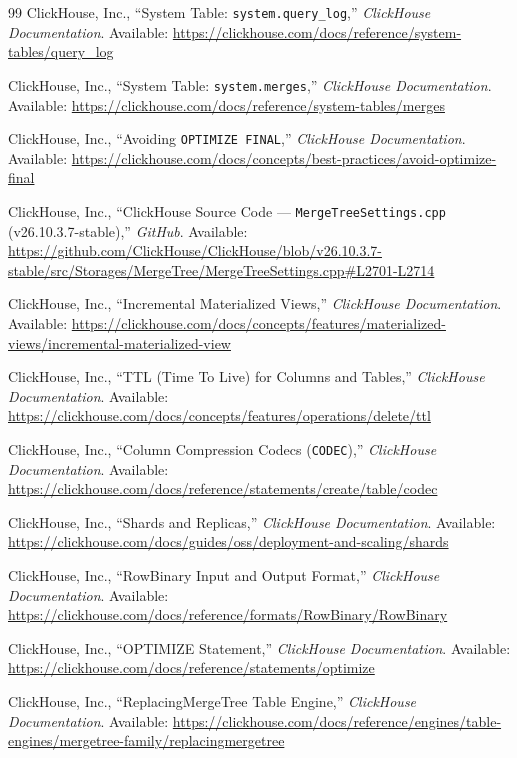 \documentclass[13pt,a4paper]{report}
\begin{document}
\begin{thebibliography}{99}
 ClickHouse, Inc., ``System Table: \texttt{system.query\_log},'' \textit{ClickHouse Documentation}. Available: \url{https://clickhouse.com/docs/reference/system-tables/query_log}

 ClickHouse, Inc., ``System Table: \texttt{system.merges},'' \textit{ClickHouse Documentation}. Available: \url{https://clickhouse.com/docs/reference/system-tables/merges}

 ClickHouse, Inc., ``Avoiding \texttt{OPTIMIZE FINAL},'' \textit{ClickHouse Documentation}. Available: \url{https://clickhouse.com/docs/concepts/best-practices/avoid-optimize-final}

 ClickHouse, Inc., ``ClickHouse Source Code --- \texttt{MergeTreeSettings.cpp} (v26.10.3.7-stable),'' \textit{GitHub}. Available: \url{https://github.com/ClickHouse/ClickHouse/blob/v26.10.3.7-stable/src/Storages/MergeTree/MergeTreeSettings.cpp#L2701-L2714}

 ClickHouse, Inc., ``Incremental Materialized Views,'' \textit{ClickHouse Documentation}. Available: \url{https://clickhouse.com/docs/concepts/features/materialized-views/incremental-materialized-view}

 ClickHouse, Inc., ``TTL (Time To Live) for Columns and Tables,'' \textit{ClickHouse Documentation}. Available: \url{https://clickhouse.com/docs/concepts/features/operations/delete/ttl}

 ClickHouse, Inc., ``Column Compression Codecs (\texttt{CODEC}),'' \textit{ClickHouse Documentation}. Available: \url{https://clickhouse.com/docs/reference/statements/create/table/codec}

 ClickHouse, Inc., ``Shards and Replicas,'' \textit{ClickHouse Documentation}. Available: \url{https://clickhouse.com/docs/guides/oss/deployment-and-scaling/shards}

 ClickHouse, Inc., ``RowBinary Input and Output Format,'' \textit{ClickHouse Documentation}. Available: \url{https://clickhouse.com/docs/reference/formats/RowBinary/RowBinary}

 ClickHouse, Inc., ``OPTIMIZE Statement,'' \textit{ClickHouse Documentation}. Available: \url{https://clickhouse.com/docs/reference/statements/optimize}

 ClickHouse, Inc., ``ReplacingMergeTree Table Engine,'' \textit{ClickHouse Documentation}. Available: \url{https://clickhouse.com/docs/reference/engines/table-engines/mergetree-family/replacingmergetree}


\end{thebibliography}
\end{document}
